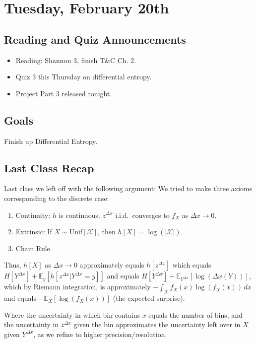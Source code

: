 \section{Tuesday, February 20th}
\subsection{Reading and Quiz Announcements}
\begin{itemize}
    \item Reading: Shannon 3, finish T\&C Ch. 2.
    \item Quiz 3 this Thursday on differential entropy.
    \item Project Part 3 released tonight.
\end{itemize}

\subsection{Goals}
Finish up Differential Entropy.

\subsection{Last Class Recap}
Last class we left off with the following argument: We tried to make three axioms corresponding to the discrete case:
\begin{enumerate}
    \item Continuity: \( h \) is continuous. \( z^{\Delta x} \) i.i.d.\ converges to \( f_X \) as \( \Delta x \to 0 \).
    \item Extrinsic: If \( X \sim \text{Unif}[\mathcal{X}] \), then \( h[X] = \log(|\mathcal{X}|) \).
    \item Chain Rule.
\end{enumerate}
Thus, \( h[X] \) as \( \Delta x \to 0 \) approximately equals \( h[z^{\Delta x}] \) which equals \( H[Y^{\Delta x}] + \mathbb{E}_y[h[z^{\Delta x} | Y^{\Delta x} = y]] \) and equals \( H[Y^{\Delta x}] + \mathbb{E}_{Y^{\Delta x}}[\log(\Delta x(Y))] \), which by Riemann integration, is approximately \( -\int_{\mathcal{X}} f_X(x) \log(f_X(x)) \, dx \) and equals \( -\mathbb{E}_X[\log(f_X(x))] \) (the expected surprise).

Where the uncertainty in which bin contains \( x \) equals the number of bins, and the uncertainty in \( z^{\Delta x} \) given the bin approximates the uncertainty left over in \( X \) given \( Y^{\Delta x} \), as we refine to higher precision/resolution.

